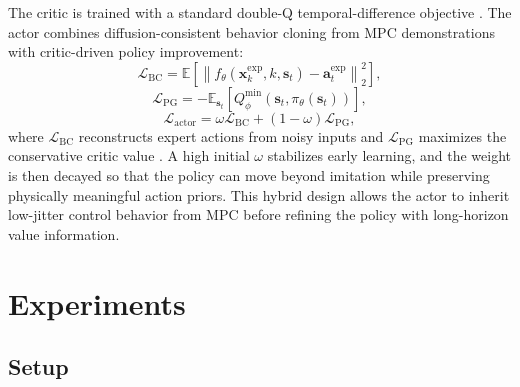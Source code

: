 \documentclass[conference]{IEEEtran}
\theoremstyle{nonumberplain}
\theoremstyle{plain}
\begin{document}
The critic is trained with a standard double-Q temporal-difference objective \cite{fujimoto2018addressing}. The actor combines diffusion-consistent behavior cloning from MPC demonstrations with critic-driven policy improvement:
\begin{equation}
    \mathcal{L}_{\mathrm{BC}}=
    \mathbb{E}\left[
    \left\|
    f_{\theta}(\mathbf{x}_k^{\mathrm{exp}},k,\mathbf{s}_t)-
    \mathbf{a}_t^{\mathrm{exp}}
    \right\|_2^2
    \right],
    \label{eq:bc_loss}
\end{equation}
\begin{equation}
    \mathcal{L}_{\mathrm{PG}}=
    -\mathbb{E}_{\mathbf{s}_t}\left[
    Q_{\phi}^{\min}(\mathbf{s}_t,\pi_{\theta}(\mathbf{s}_t))
    \right],
    \label{eq:pg_loss}
\end{equation}
\begin{equation}
    \mathcal{L}_{\mathrm{actor}}=
    \omega \mathcal{L}_{\mathrm{BC}}+
    (1-\omega)\mathcal{L}_{\mathrm{PG}},
    \label{eq:actor_loss}
\end{equation}
where $\mathcal{L}_{\mathrm{BC}}$ reconstructs expert actions from noisy inputs and $\mathcal{L}_{\mathrm{PG}}$ maximizes the conservative critic value \cite{fujimoto2021minimalist}. A high initial $\omega$ stabilizes early learning, and the weight is then decayed so that the policy can move beyond imitation while preserving physically meaningful action priors. This hybrid design allows the actor to inherit low-jitter control behavior from MPC before refining the policy with long-horizon value information.

\section{Experiments}
\label{sec:experiments}

\subsection{Setup}
\end{document}
